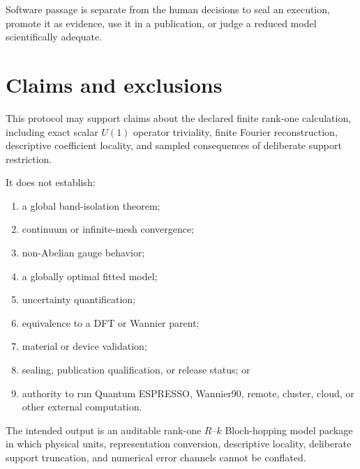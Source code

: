\documentclass[11pt]{article}
\begin{document}
Software passage is separate from the human decisions to seal an execution, promote it
as evidence, use it in a publication, or judge a reduced model scientifically adequate.

\section{Claims and exclusions}

This protocol may support claims about the declared finite rank-one calculation,
including exact scalar $U(1)$ operator triviality, finite Fourier reconstruction,
descriptive coefficient locality, and sampled consequences of deliberate support
restriction.

It does not establish:
\begin{enumerate}[leftmargin=*]
  \item a global band-isolation theorem;
  \item continuum or infinite-mesh convergence;
  \item non-Abelian gauge behavior;
  \item a globally optimal fitted model;
  \item uncertainty quantification;
  \item equivalence to a DFT or Wannier parent;
  \item material or device validation;
  \item sealing, publication qualification, or release status; or
  \item authority to run Quantum ESPRESSO, Wannier90, remote, cluster, cloud, or other
    external computation.
\end{enumerate}

The intended output is an auditable rank-one $R$--$k$ Bloch-hopping model package in
which physical units, representation conversion, descriptive locality, deliberate
support truncation, and numerical error channels cannot be conflated.
\end{document}
